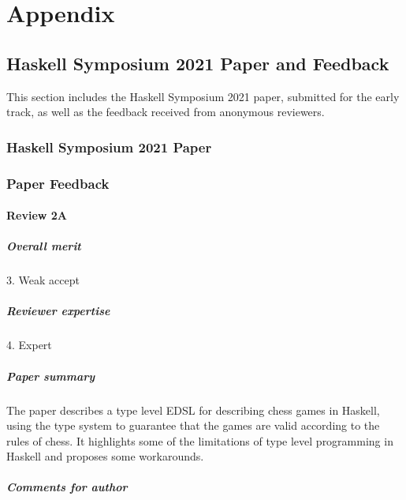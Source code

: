 \chapter{Appendix}

\section{Haskell Symposium 2021 Paper and Feedback}

This section includes the Haskell Symposium 2021 paper, submitted for the early track, as well as the feedback received from anonymous reviewers.

\subsection{Haskell Symposium 2021 Paper}



\subsection{Paper Feedback}

\subsubsection{Review 2A}

\paragraph{Overall merit}

3. Weak accept

\paragraph{Reviewer expertise}

4. Expert

\paragraph{Paper summary}

The paper describes a type level EDSL for describing chess games in Haskell, using the type system to guarantee that the games are valid according to the rules of chess. It highlights some of the limitations of type level programming in Haskell and proposes some workarounds.

\paragraph{Comments for author}

